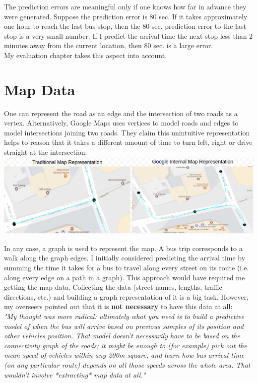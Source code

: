 \documentclass[12pt,a4paper,oneside,openright]{report}
\begin{document}
The prediction errors are meaningful only if one knows how far in advance they were
generated. Suppose the prediction error is 80 sec. If it takes approximately one hour to reach
the last bus stop, then the 80 sec. prediction error to the last stop is a very small number.
If I predict the arrival time the next stop less than 2 minutes away from the current location,
then 80 sec. is a large error. \\

My evaluation chapter takes this aspect into account.

\section{Map Data}

One can represent the road as an edge and the intersection of two roads as a vertex.
Alternatively, Google Maps uses vertices to model roads and edges to model intersections
joining two roads. They claim this unintuitive representation helps to reason that
it takes a different amount of time to turn left, right or drive straight at the intersection: \\

\includegraphics[width=\textwidth]{figs/google.png}

In any case, a graph is used to represent the map. A bus trip corresponds to a walk
along the graph edges. I initially considered predicting the arrival time by summing the
time it takes for a bus to travel along every street on its route (i.e. along every edge on
a path in a graph). This approach would have required
me getting the map data. Collecting the data (street names, lengths, traffic directions, etc.)
and building a graph representation of it is a big task. However, my overseers pointed out
that it is \textbf{not necessary} to have this data at all: \\

\textit{"My thought was more radical: ultimately what you need is to build a predictive
 model of when the bus will arrive based on previous samples of its position and other
 vehicles position. That model doesn't necessarily have to be based on the connectivity
 graph of the roads; it might be enough to (for example) pick out the mean speed of
 vehicles within any 200m square, and learn how bus arrival time (on any particular route)
 depends on all those speeds across the whole area. That wouldn't involve *extracting* map
 data at all."} \\
\end{document}
